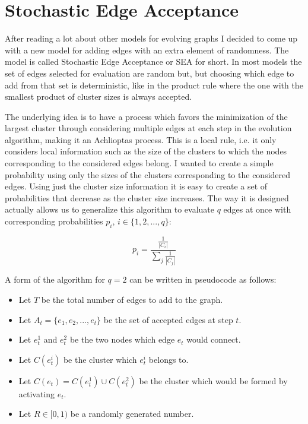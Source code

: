 \section{Stochastic Edge Acceptance}
After reading a lot about other models for evolving graphs I decided to come up with a new model for adding edges with an extra element of randomness.
The model is called Stochastic Edge Acceptance or SEA for short.
In most models the set of edges selected for evaluation are random but, but choosing which edge to add from that set is deterministic, like in the product rule where the one with the smallest product of cluster sizes is always accepted.

The underlying idea is to have a process which favors the minimization of the largest cluster through considering multiple edges at each step in the evolution algorithm, making it an Achlioptas process.
This is a local rule, i.e. it only considers local information such as the size of the clusters to which the nodes corresponding to the considered edges belong.
I wanted to create a simple probability using only the sizes of the clusters corresponding to the considered edges.
Using just the cluster size information it is easy to create a set of probabilities that decrease as the cluster size increases.
The way it is designed actually allows us to generalize this algorithm to evaluate $q$ edges at once with corresponding probabilities $p_i$, $i \in \{1, 2, ..., q\}$:

\begin{equation}
	p_i = \frac{\frac{1}{|C_i|}}{\sum_j \frac{1}{|C_j|}}
\end{equation}

A form of the algorithm for $q = 2$ can be written in pseudocode as follows:
\begin{itemize}
	\item Let $T$ be the total number of edges to add to the graph.
	\item Let $A_t = \{e_1, e_2, ..., e_t\}$ be the set of accepted edges at step $t$.
	\item Let $e_t^1$ and $e_t^2$ be the two nodes which edge $e_t$ would connect.
	\item Let $C(e_t^i)$ be the cluster which $e_t^i$ belongs to.
	\item Let $C(e_t) = C(e_t^1) \cup C(e_t^2)$ be the cluster which would be formed by activating $e_t$.
	\item Let $R \in [0, 1)$ be a randomly generated number.
\end{itemize}

